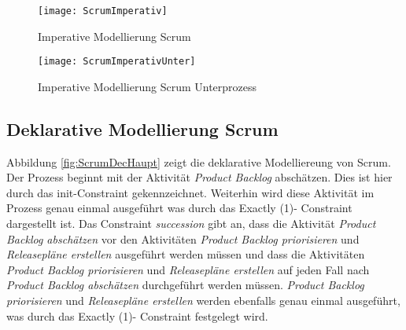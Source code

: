 \begin{figure}[htp]
\begin{center}
  \texttt{[image: ScrumImperativ]} %
  \caption{Imperative Modellierung Scrum}
  \label{fig:ScrumImperativ}
\end{center}
\end{figure}

\begin{figure}[htp]
\begin{center}
  \texttt{[image: ScrumImperativUnter]} %
  \caption{Imperative Modellierung Scrum Unterprozess}
  \label{fig:ScrumImperativUnter}
\end{center}
\end{figure}
\clearpage

\subsection{Deklarative Modellierung Scrum}

Abbildung \ref{fig:ScrumDecHaupt} zeigt die deklarative Modelliereung von Scrum.\newline
Der Prozess beginnt mit der Aktivität \textit{Product Backlog} abschätzen. Dies ist hier durch das init-Constraint gekennzeichnet. Weiterhin wird diese Aktivität im Prozess genau einmal ausgeführt was durch das Exactly (1)- Constraint dargestellt ist. Das Constraint \textit{succession} gibt an, dass die Aktivität \textit{Product Backlog abschätzen} vor den Aktivitäten \textit{Product Backlog priorisieren} und \textit{Releasepläne erstellen} ausgeführt werden müssen und dass die Aktivitäten \textit{Product Backlog priorisieren} und \textit{Releasepläne erstellen} auf jeden Fall nach \textit{Product Backlog abschätzen} durchgeführt werden müssen. \textit{Product Backlog priorisieren} und \textit{Releasepläne erstellen} werden ebenfalls genau einmal ausgeführt, was durch das Exactly (1)- Constraint festgelegt wird.  \newline

